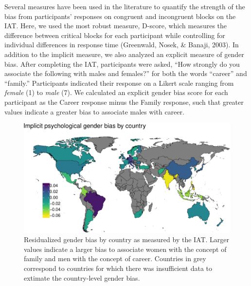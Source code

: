 \documentclass[man,floatsintext]{apa6}
\theoremstyle{definition}
\theoremstyle{definition}
\theoremstyle{definition}
\theoremstyle{remark}
\begin{document}
Several measures have been used in the literature to quantify the
strength of the bias from participants' responses on congruent and
incongruent blocks on the IAT. Here, we used the most robust measure,
D-score, which measures the difference between critical blocks for each
participant while controlling for individual differences in response
time (Greenwald, Nosek, \& Banaji, 2003). In addition to the implicit
measure, we also analyzed an explicit measure of gender bias. After
completing the IAT, participants were asked, \enquote{How strongly do
you associate the following with males and females?} for both the words
\enquote{career} and \enquote{family.} Participants indicated their
response on a Likert scale ranging from \emph{female} (1) to \emph{male}
(7). We calculated an explicit gender bias score for each participant as
the Career response minus the Family response, such that greater values
indicate a greater bias to associate males with career.

\begin{figure}[t]

{\centering \includegraphics{iat_lang_files/figure-latex/mapplot-1} 

}

\caption{Residualized gender bias by country as measured by the IAT. Larger values indicate a larger bias to associate women with the concept of family and men with the concept of career. Countries in grey correspond to countries for which there was insufficient data to extimate the country-level gender bias.}\label{fig:mapplot}
\end{figure}
\end{document}
